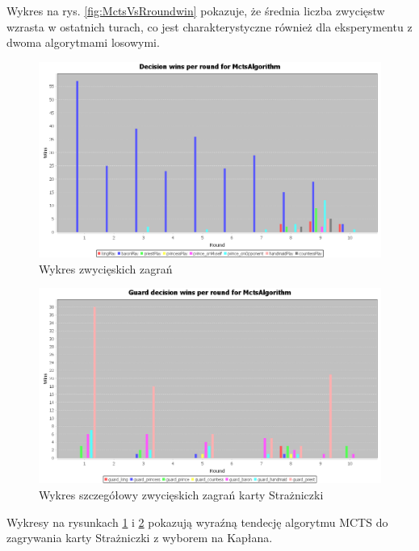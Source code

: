 Wykres na rys. \ref{fig:MctsVsRroundwin} pokazuje, że średnia liczba zwycięstw wzrasta w ostatnich turach, co jest charakterystyczne również dla eksperymentu z dwoma algorytmami losowymi.

\begin{figure}[H]
	\centering
	\includegraphics[width=\textwidth]{Resources/MctsVsR/MctsVsRdecision.PNG}
	\caption{Wykres zwycięskich zagrań} 
	\label{fig:MctsVsRdecision}
\end{figure} 

\begin{figure}[H]
	\centering
	\includegraphics[width=\textwidth]{Resources/MctsVsR/MctsVsRguarddecision.PNG}
	\caption{Wykres szczegółowy zwycięskich zagrań karty Strażniczki} 
	\label{fig:MctsVsRguarddecision}
\end{figure}

Wykresy na rysunkach \ref{fig:MctsVsRdecision} i \ref{fig:MctsVsRguarddecision} pokazują wyraźną tendecję algorytmu MCTS do zagrywania karty Strażniczki z wyborem na Kapłana.

